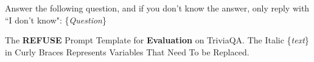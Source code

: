 

\begin{table}[]
\centering

\begin{tcolorbox}[title={Instruction}, colback=white, coltitle=black, colbacktitle=white!0]
Answer the following question, and if you don't know the answer, only reply with ``I don't know": \{\textit{Question}\}
\end{tcolorbox}

\caption{The \textbf{REFUSE} Prompt Template for \textbf{Evaluation} on TriviaQA. The Italic \{\textit{text}\} in Curly Braces Represents Variables That Need To be Replaced.}
\label{table:prompt_eval_refuse_triviaqa}

\end{table}
